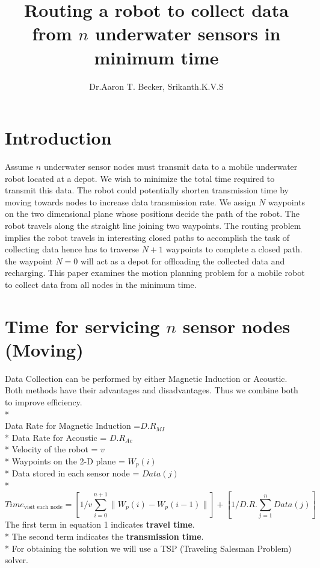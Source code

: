 \documentclass{article}
\begin{document}
\title{Routing a robot to collect data from $n$ underwater sensors in minimum time}
\author{Dr.Aaron T. Becker, Srikanth.K.V.S}
\maketitle
\section{Introduction}

 Assume $n$ underwater sensor nodes must transmit data to a mobile underwater robot located at a depot.  We wish to minimize the total time required to transmit this data. 
The robot could potentially shorten transmission time by moving towards nodes to increase data transmission rate.
We assign $N$ waypoints on the two dimensional plane whose positions decide the path of the robot. The robot travels along the straight line joining two waypoints. The routing problem implies the robot travels in interesting closed paths to accomplish the task of collecting data hence has to traverse $N+1$ waypoints to complete a closed path. the waypoint $N = 0$ will act as a depot for offloading the collected data and recharging.
This paper examines the motion planning problem for a mobile robot to collect data from all nodes in the minimum time.  

\section{Time for servicing $n$ sensor nodes (Moving)}

 Data Collection can be performed by either Magnetic Induction or Acoustic. Both methods have their advantages and disadvantages. Thus we combine both to improve efficiency.\\*
\\
Data Rate for Magnetic Induction =$ D.R_{MI}$\\*
Data Rate for Acoustic = $D.R_{Ac}$\\*
Velocity of the robot = $v$\\*
Waypoints on the 2-D plane = $W_{p}(i)$\\*
Data stored in each sensor node = $Data(j)$\\*
\begin{equation}
    \label{equation_1}
   Time_{\textrm{visit each node}}  = [1/v \sum_{i=0}^{n+1} \|W_{p}(i)-W_{p}(i-1)\|] + [1/D.R. \sum_{j=1}^{n} Data(j)]    
\end{equation}
The first term in equation 1 indicates\textbf{ travel time}.\\*
The second term indicates the \textbf{transmission time}.\\*
For obtaining the solution we will use a TSP (Traveling Salesman Problem) solver.
\end{document}
